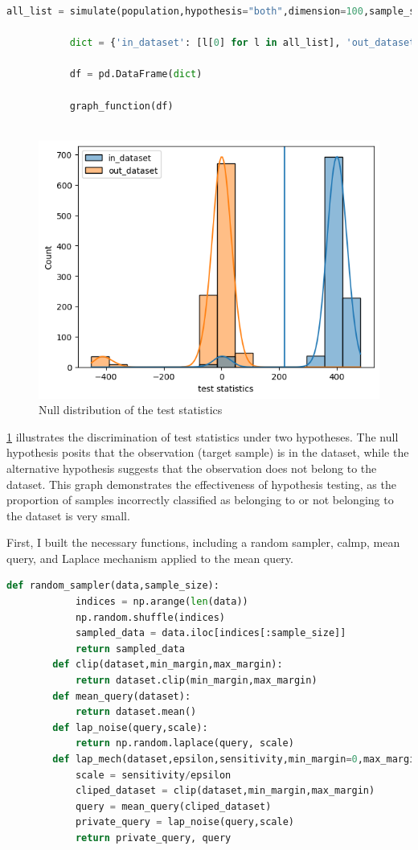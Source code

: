 \documentclass[12pt]{extarticle}
\begin{document}
	\begin{lstlisting}[language=Python]	
		   all_list = simulate(population,hypothesis="both",dimension=100,sample_size=5,num_simulations = 1000)
		   
		   dict = {'in_dataset': [l[0] for l in all_list], 'out_dataset': [l[1] for l in all_list]} 
		   
		   df = pd.DataFrame(dict)
		   
		   graph_function(df)
	
	\end{lstlisting}
	\begin{figure}[h]
		\centering
		\includegraphics[width=1\textwidth]{im3.png}
		\caption{Null distribution of the test statistics}
		\label{fig:fig3}
	\end{figure}
	\ref{fig:fig3} illustrates the discrimination of test statistics under two hypotheses. The null hypothesis posits that the observation (target sample) is in the dataset, while the alternative hypothesis suggests that the observation does not belong to the dataset. This graph demonstrates the effectiveness of hypothesis testing, as the proportion of samples incorrectly classified as belonging to or not belonging to the dataset is very small.
	\\
	First, I built the necessary functions, including a random sampler, calmp, mean query, and Laplace mechanism applied to the mean query.
	\begin{lstlisting}[language=Python]	
		def random_sampler(data,sample_size):
			indices = np.arange(len(data))
			np.random.shuffle(indices)
			sampled_data = data.iloc[indices[:sample_size]]
			return sampled_data
		def clip(dataset,min_margin,max_margin):
			return dataset.clip(min_margin,max_margin)
		def mean_query(dataset):
			return dataset.mean()
		def lap_noise(query,scale):
			return np.random.laplace(query, scale)
		def lap_mech(dataset,epsilon,sensitivity,min_margin=0,max_margin=20):
			scale = sensitivity/epsilon
			cliped_dataset = clip(dataset,min_margin,max_margin)
			query = mean_query(cliped_dataset)
			private_query = lap_noise(query,scale)
			return private_query, query
	\end{lstlisting}
\end{document}
